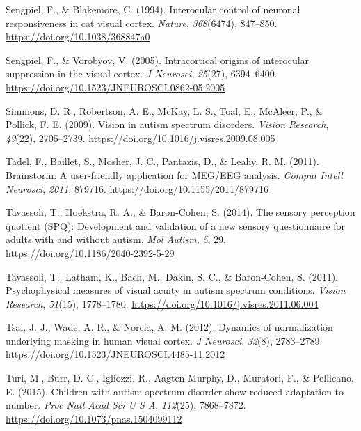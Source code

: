 \documentclass[
]{article}
\newlength{\cslhangindent}
\newlength{\cslentryspacingunit} %
\newenvironment{CSLReferences}[2] %
 {%
  \setlength{\parindent}{0pt}
  \ifodd #1
  \let\oldpar\par
  \def\par{\hangindent=\cslhangindent\oldpar}
  \fi
  \setlength{\parskip}{#2\cslentryspacingunit}
 }%
 {}
\begin{document}
\begin{CSLReferences}{1}{0}
\leavevmode{}%
Sengpiel, F., \& Blakemore, C. (1994). Interocular control of neuronal responsiveness in cat visual cortex. \emph{Nature}, \emph{368}(6474), 847--850. \url{https://doi.org/10.1038/368847a0}

\leavevmode{}%
Sengpiel, F., \& Vorobyov, V. (2005). Intracortical origins of interocular suppression in the visual cortex. \emph{J Neurosci}, \emph{25}(27), 6394--6400. \url{https://doi.org/10.1523/JNEUROSCI.0862-05.2005}

\leavevmode{}%
Simmons, D. R., Robertson, A. E., McKay, L. S., Toal, E., McAleer, P., \& Pollick, F. E. (2009). Vision in autism spectrum disorders. \emph{Vision Research}, \emph{49}(22), 2705--2739. \url{https://doi.org/10.1016/j.visres.2009.08.005}

\leavevmode{}%
Tadel, F., Baillet, S., Mosher, J. C., Pantazis, D., \& Leahy, R. M. (2011). Brainstorm: A user-friendly application for MEG/EEG analysis. \emph{Comput Intell Neurosci}, \emph{2011}, 879716. \url{https://doi.org/10.1155/2011/879716}

\leavevmode{}%
Tavassoli, T., Hoekstra, R. A., \& Baron-Cohen, S. (2014). The sensory perception quotient (SPQ): Development and validation of a new sensory questionnaire for adults with and without autism. \emph{Mol Autism}, \emph{5}, 29. \url{https://doi.org/10.1186/2040-2392-5-29}

\leavevmode{}%
Tavassoli, T., Latham, K., Bach, M., Dakin, S. C., \& Baron-Cohen, S. (2011). Psychophysical measures of visual acuity in autism spectrum conditions. \emph{Vision Research}, \emph{51}(15), 1778--1780. \url{https://doi.org/10.1016/j.visres.2011.06.004}

\leavevmode{}%
Tsai, J. J., Wade, A. R., \& Norcia, A. M. (2012). Dynamics of normalization underlying masking in human visual cortex. \emph{J Neurosci}, \emph{32}(8), 2783--2789. \url{https://doi.org/10.1523/JNEUROSCI.4485-11.2012}

\leavevmode{}%
Turi, M., Burr, D. C., Igliozzi, R., Aagten-Murphy, D., Muratori, F., \& Pellicano, E. (2015). Children with autism spectrum disorder show reduced adaptation to number. \emph{Proc Natl Acad Sci U S A}, \emph{112}(25), 7868--7872. \url{https://doi.org/10.1073/pnas.1504099112}


\end{CSLReferences}
\end{document}
